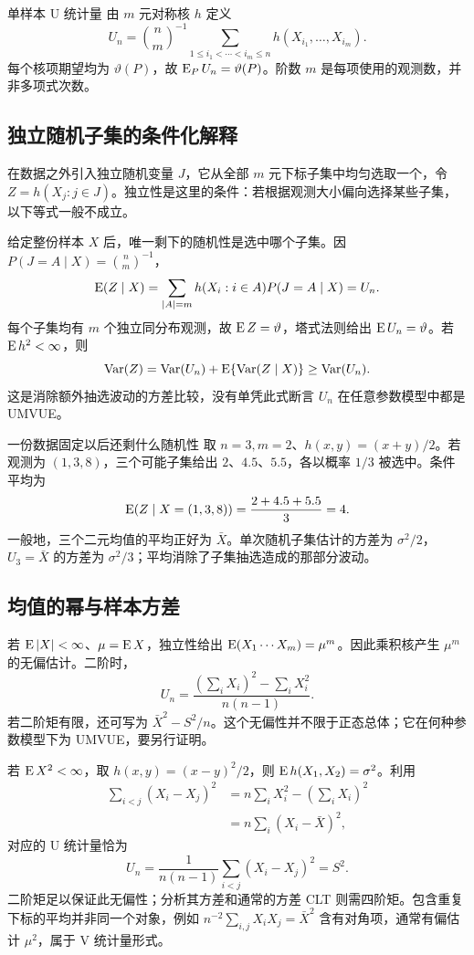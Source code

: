 \begin{definitionbox}{单样本 U 统计量}
由 $m$ 元对称核 $h$ 定义
\[
 U_n=\binom nm^{-1}
 \sum_{1\leq i_1<\cdots<i_m\leq n}
 h(X_{i_1},\ldots,X_{i_m}).
\]
每个核项期望均为 $\vartheta(P)$，故 $\operatorname{E}_PU_n=\vartheta(P)$。阶数 $m$ 是每项使用的观测数，并非多项式次数。
\end{definitionbox}

\subsection{独立随机子集的条件化解释}

在数据之外引入独立随机变量 $J$，它从全部 $m$ 元下标子集中均匀选取一个，令 $Z=h(X_j:j\in J)$。独立性是这里的条件：若根据观测大小偏向选择某些子集，以下等式一般不成立。

给定整份样本 $X$ 后，唯一剩下的随机性是选中哪个子集。因 $P(J=A\mid X)=\binom nm^{-1}$，
\[
 \operatorname{E}(Z\mid X)=\sum_{|A|=m}h(X_i:i\in A)P(J=A\mid X)=U_n.
\]
每个子集均有 $m$ 个独立同分布观测，故 $\operatorname{E} Z=\vartheta$，塔式法则给出 $\operatorname{E} U_n=\vartheta$。若 $\operatorname{E} h^2<\infty$，则
\[
 \operatorname{Var}(Z)=\operatorname{Var}(U_n)+\operatorname{E}\{\operatorname{Var}(Z\mid X)\}\geq\operatorname{Var}(U_n).
\]
这是消除额外抽选波动的方差比较，没有单凭此式断言 $U_n$ 在任意参数模型中都是 UMVUE。

\begin{examplebox}{一份数据固定以后还剩什么随机性}
取 $n=3,m=2$、$h(x,y)=(x+y)/2$。若观测为 $(1,3,8)$，三个可能子集给出 $2$、$4.5$、$5.5$，各以概率 $1/3$ 被选中。条件平均为
\[
 \operatorname{E}(Z\mid X=(1,3,8))=\frac{2+4.5+5.5}{3}=4.
\]
一般地，三个二元均值的平均正好为 $\bar X$。单次随机子集估计的方差为 $\sigma^2/2$，$U_3=\bar X$ 的方差为 $\sigma^2/3$；平均消除了子集抽选造成的那部分波动。
\end{examplebox}

\subsection{均值的幂与样本方差}

若 $\operatorname{E}|X|<\infty$、$\mu=\operatorname{E} X$，独立性给出 $\operatorname{E}(X_1\cdots X_m)=\mu^m$。因此乘积核产生 $\mu^m$ 的无偏估计。二阶时，
\[
 U_n=\frac{(\sum_iX_i)^2-\sum_iX_i^2}{n(n-1)}.
\]
若二阶矩有限，还可写为 $\bar X^2-S^2/n$。这个无偏性并不限于正态总体；它在何种参数模型下为 UMVUE，要另行证明。

若 $\operatorname{E} X^2<\infty$，取 $h(x,y)=(x-y)^2/2$，则 $\operatorname{E} h(X_1,X_2)=\sigma^2$。利用
\begin{align*}
 \sum_{i<j}(X_i-X_j)^2
 &=n\sum_iX_i^2-\left(\sum_iX_i\right)^2\\
 &=n\sum_i(X_i-\bar X)^2,
\end{align*}
对应的 U 统计量恰为
\[
 U_n=\frac1{n(n-1)}\sum_{i<j}(X_i-X_j)^2=S^2.
\]
二阶矩足以保证此无偏性；分析其方差和通常的方差 CLT 则需四阶矩。包含重复下标的平均并非同一个对象，例如 $n^{-2}\sum_{i,j}X_iX_j=\bar X^2$ 含有对角项，通常有偏估计 $\mu^2$，属于 V 统计量形式。

